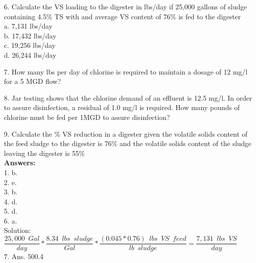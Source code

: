 \vspace{0.3cm}
6. Calculate the VS loading to the digester in lbs/day if 25,000 gallons of sludge containing 4.5\% TS with and average VS content of 76\% is fed to the digester\\

a. 7,131 lbs/day \\
b. 17,432 lbs/day \\
c. 19,256 lbs/day \\
d. 26,244 lbs/day \\
\vspace{0.3cm}

7. How many lbs per day of chlorine is required to maintain a dosage of 12 mg/l for a 5 MGD flow?\\

\vspace{0.3cm}


8. Jar testing shows that the chlorine demand of an effluent is 12.5 mg/l. In order to assure disinfection, a residual of 1.0 mg/l is required. How many pounds of chlorine must be fed per 1MGD to assure disinfection?\\

\vspace{0.3cm}

9. Calculate the \% VS reduction in a digester given the volatile solids content of the feed sludge to the digester is 76\% and the volatile solids content of the sludge leaving the digester is 55\%\\




\vspace{1cm}
\textbf{Answers:}\\
1.	b.  \\

\vspace{0.3cm}
2.	e.  \\

\vspace{0.3cm}
3.	b.  \\

\vspace{0.3cm}
4.	d.  \\

\vspace{0.3cm}
5.	d.  \\

\vspace{0.3cm}
6.	a.  \\
\vspace{0.3cm}
Solution:\\
$\dfrac{25,000 \enspace Gal}{day}*\dfrac{8.34 \enspace lbs \enspace sludge}{Gal}* \dfrac{(0.045*0.76) \enspace lbs \enspace VS \enspace feed}{lb \enspace sludge}=\boxed{\dfrac{7,131 \enspace lbs \enspace VS }{day} } $\\
\vspace{0.3cm}
7.	Ans.  500.4\\
 
